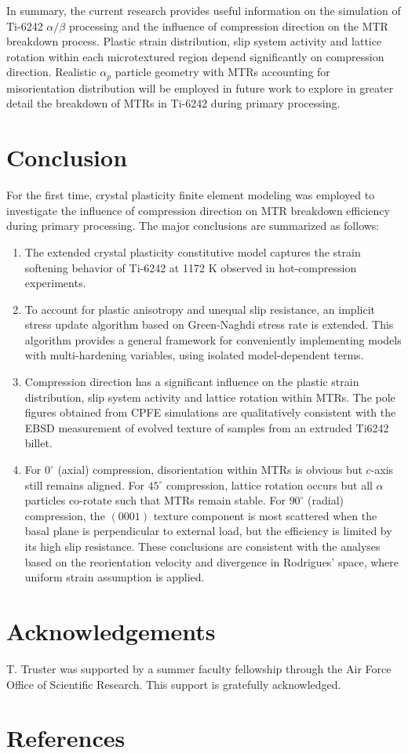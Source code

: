 \documentclass[review]{elsarticle}
\begin{document}
In summary, the current research provides useful information on the simulation of Ti-6242 $\alpha / \beta$ processing and the influence of compression direction on the MTR breakdown process.
Plastic strain distribution, slip system activity and lattice rotation within each microtextured region depend significantly on compression direction.
Realistic $\alpha_p$ particle geometry with MTRs accounting for misorientation distribution will be employed in future work to explore in greater detail the breakdown of MTRs in Ti-6242 during primary processing.
%
\section{Conclusion}
\label{conclusion}
For the first time, crystal plasticity finite element modeling was employed to investigate the influence of compression direction on MTR breakdown efficiency during primary processing.
The major conclusions are summarized as follows:
\begin{enumerate}
\item The extended crystal plasticity constitutive model captures the strain softening behavior of Ti-6242 at 1172 K observed in hot-compression experiments.
\item To account for plastic anisotropy and unequal slip resistance, an implicit stress update algorithm based on Green-Naghdi stress rate is extended.
This algorithm provides a general framework for conveniently implementing models with multi-hardening variables, using isolated model-dependent terms.
\item Compression direction has a significant influence on the plastic strain distribution, slip system activity and lattice rotation within MTRs.
The pole figures obtained from CPFE simulations are qualitatively consistent with the EBSD measurement of evolved texture of samples from an extruded Ti6242 billet.
\item For $0^{\circ}$ (axial) compression, disorientation within MTRs is obvious but $c$-axis still remains aligned.
For $45^{\circ}$ compression, lattice rotation occurs but all $\alpha$ particles co-rotate such that MTRs remain stable.
For $90^{\circ}$ (radial) compression, the $(0001)$ texture component is most scattered when the basal plane is perpendicular to external load, but the efficiency is limited by its high slip resistance.
These conclusions are consistent with the analyses based on the reorientation velocity and divergence in Rodrigues' space, where uniform strain assumption is applied.
\end{enumerate}
\section{Acknowledgements}
T. Truster was supported by a summer faculty fellowship through the Air Force Office of Scientific Research. This support is gratefully acknowledged.
\section*{References}


\end{document}
